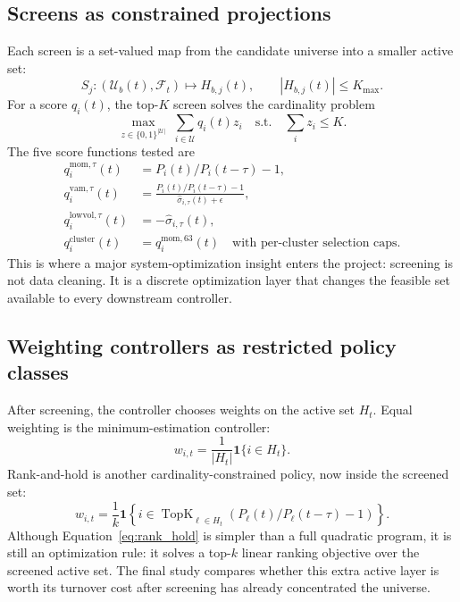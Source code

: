 \documentclass[11pt,a4paper]{article}
\begin{document}
\subsection{Screens as constrained projections}
Each screen is a set-valued map from the candidate universe into a smaller active set:
\begin{equation}
S_j:\left(\mathcal{U}_b(t),\mathcal{F}_t\right)\mapsto H_{b,j}(t),\qquad |H_{b,j}(t)|\le K_{\max}.
\end{equation}
For a score $q_i(t)$, the top-$K$ screen solves the cardinality problem
\begin{equation}
\max_{z\in\{0,1\}^{|\mathcal{U}|}}\; \sum_{i\in\mathcal{U}} q_i(t)z_i
\quad\text{s.t.}\quad \sum_i z_i\le K.
\label{eq:topk}
\end{equation}
The five score functions tested are
\begin{align}
q_i^{\text{mom},\tau}(t) &= P_i(t)/P_i(t-\tau)-1,\\
q_i^{\text{vam},\tau}(t) &= \frac{P_i(t)/P_i(t-\tau)-1}{\widehat{\sigma}_{i,\tau}(t)+\epsilon},\\
q_i^{\text{lowvol},\tau}(t) &= -\widehat{\sigma}_{i,\tau}(t),\\
q_i^{\text{cluster}}(t) &= q_i^{\text{mom},63}(t)\quad\text{with per-cluster selection caps}.
\end{align}
This is where a major system-optimization insight enters the project: screening is not data cleaning. It is a discrete optimization layer that changes the feasible set available to every downstream controller.

\subsection{Weighting controllers as restricted policy classes}
After screening, the controller chooses weights on the active set $H_t$. Equal weighting is the minimum-estimation controller:
\begin{equation}
w_{i,t}=\frac{1}{|H_t|}\mathbf{1}\{i\in H_t\}.
\end{equation}
Rank-and-hold is another cardinality-constrained policy, now inside the screened set:
\begin{equation}
w_{i,t}=\frac{1}{k}\mathbf{1}\left\{i\in\operatorname{TopK}_{\ell\in H_t}\left(P_\ell(t)/P_\ell(t-\tau)-1\right)\right\}.
\label{eq:rank_hold}
\end{equation}
Although Equation~\eqref{eq:rank_hold} is simpler than a full quadratic program, it is still an optimization rule: it solves a top-$k$ linear ranking objective over the screened active set. The final study compares whether this extra active layer is worth its turnover cost after screening has already concentrated the universe.
\end{document}
